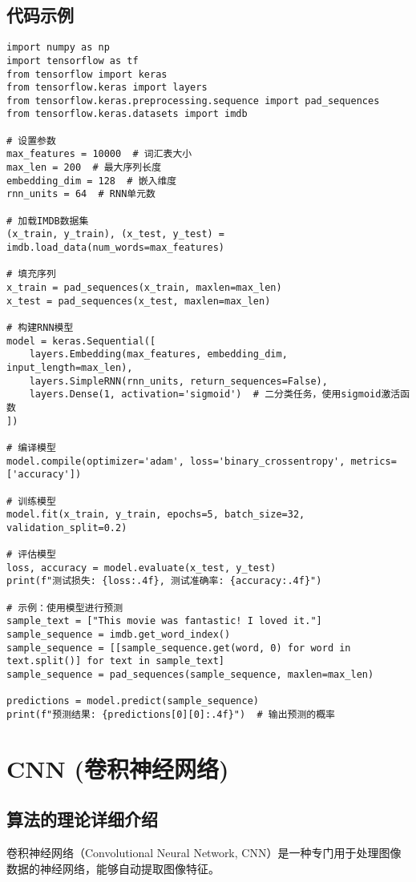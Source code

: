 \subsection*{代码示例}
\begin{lstlisting}
import numpy as np
import tensorflow as tf
from tensorflow import keras
from tensorflow.keras import layers
from tensorflow.keras.preprocessing.sequence import pad_sequences
from tensorflow.keras.datasets import imdb

# 设置参数
max_features = 10000  # 词汇表大小
max_len = 200  # 最大序列长度
embedding_dim = 128  # 嵌入维度
rnn_units = 64  # RNN单元数

# 加载IMDB数据集
(x_train, y_train), (x_test, y_test) = imdb.load_data(num_words=max_features)

# 填充序列
x_train = pad_sequences(x_train, maxlen=max_len)
x_test = pad_sequences(x_test, maxlen=max_len)

# 构建RNN模型
model = keras.Sequential([
    layers.Embedding(max_features, embedding_dim, input_length=max_len),
    layers.SimpleRNN(rnn_units, return_sequences=False),
    layers.Dense(1, activation='sigmoid')  # 二分类任务，使用sigmoid激活函数
])

# 编译模型
model.compile(optimizer='adam', loss='binary_crossentropy', metrics=['accuracy'])

# 训练模型
model.fit(x_train, y_train, epochs=5, batch_size=32, validation_split=0.2)

# 评估模型
loss, accuracy = model.evaluate(x_test, y_test)
print(f"测试损失: {loss:.4f}, 测试准确率: {accuracy:.4f}")

# 示例：使用模型进行预测
sample_text = ["This movie was fantastic! I loved it."]
sample_sequence = imdb.get_word_index()
sample_sequence = [[sample_sequence.get(word, 0) for word in text.split()] for text in sample_text]
sample_sequence = pad_sequences(sample_sequence, maxlen=max_len)

predictions = model.predict(sample_sequence)
print(f"预测结果: {predictions[0][0]:.4f}")  # 输出预测的概率

\end{lstlisting}


\section{CNN (卷积神经网络)}
\subsection*{算法的理论详细介绍}
卷积神经网络（Convolutional Neural Network, CNN）是一种专门用于处理图像数据的神经网络，能够自动提取图像特征。

